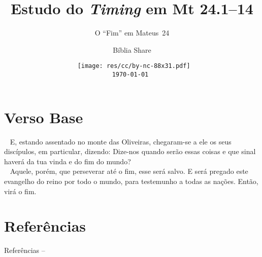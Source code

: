 \documentclass[12pt,aspectratio=169]{beamer}
\title{Estudo do \textit{Timing} em Mt 24.1--14}
\subtitle{O ``Fim'' em Mateus~24}
\author{Bíblia Share}
\date[{\tiny\tt\today}]{{\scriptsize\tt%
    \texttt{[image: res/cc/by-nc-88x31.pdf]}\\[\smallskipamount]
    \today
}}
\newcommand{\ver}[1]{%
    \raisebox{0.50ex}{%
        \scalebox{1.1}{%
            \pmb{\textbf{\textcolor{BSpbg}{#1}}}%
        }%
    }%
}
\newcommand{\QUOTE}[1]{%
    \par\noindent\hspace*{0.1\linewidth}%
    \begin{minipage}{0.8\linewidth}%
        \linespread{1.35}\large{#1}%
    \end{minipage}%
}
\newcommand{\YEL}[1]{{\textcolor{TXyel}{#1}}}
\newcommand{\GRE}[1]{{\textcolor{TXgre}{#1}}}
\newcommand{\MAG}[1]{{\textcolor{TXmag}{#1}}}
\begin{document}
\begin{frame}
    \titlepage
\end{frame}
\section{Verso Base}

    \begin{frame}
        \QUOTE{%
            \ver{(ARC) Mt~24.3}~%
            E, estando  assentado  no  monte  das  Oliveiras,  chegaram-se  a  ele  os  seus
            discípulos, em particular, dizendo: Dize-nos \YEL{quando serão essas  coisas}  e
            \GRE{que sinal haverá da tua vinda} e do \MAG{fim do mundo?} \\[\medskipamount]
            \ver{(ARA) Mt~24.13,14}~%
            Aquele, porém, que perseverar até o \MAG{fim}, esse será salvo. E  será  pregado
            este evangelho do reino por todo o mundo, para testemunho  a  todas  as  nações.
            Então, virá o \MAG{fim}.
        }
    \end{frame}

\section{Referências}

    \begin{frame}[allowframebreaks]{Referências -- }
        
        
    \end{frame}

\end{document}
